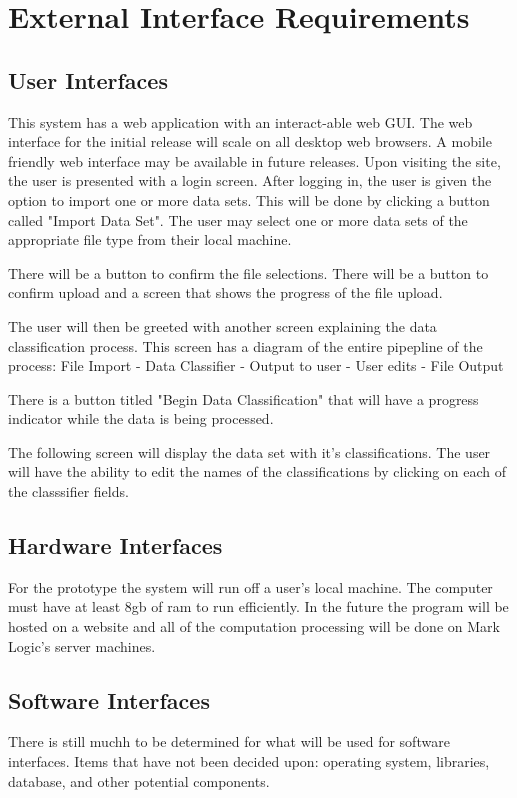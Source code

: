 \documentclass[12pt,oneside,letterpaper]{article}
\begin{document}
\section{External Interface Requirements}
\subsection{User Interfaces}
This system has a web application with an interact-able web GUI. The web interface for the initial release will scale on all desktop web browsers. A mobile friendly web interface may be available in future releases. Upon visiting the site, the user is presented with a login screen. After logging in, the user is given the option to import one or more data sets. This will be done by clicking a button called "Import Data Set". The user may select one or more data sets of the appropriate file type from their local machine. 

There will be a button to confirm the file selections. There will be a button to confirm upload and a screen that shows the progress of the file upload.

The user will then be greeted with another screen explaining the data classification process. This screen has a diagram of the entire pipepline of the process: File Import - Data Classifier - Output to user - User edits - File Output

There is a button titled "Begin Data Classification" that will have a progress indicator while the data is being processed. 

The following screen will display the data set with it's classifications. The user will have the ability to edit the names of the classifications by clicking on each of the classsifier fields.

\subsection{Hardware Interfaces}
For the prototype the system will run off a user's local machine. The computer must have at least 8gb of ram to run efficiently. In the future the program will be hosted on a website and all of the computation processing will be done on Mark Logic's server machines.
\subsection{Software Interfaces}
There is still muchh to be determined for what will be used for software interfaces. Items that have not been decided upon: operating system, libraries, database, and other potential components.
\end{document}
